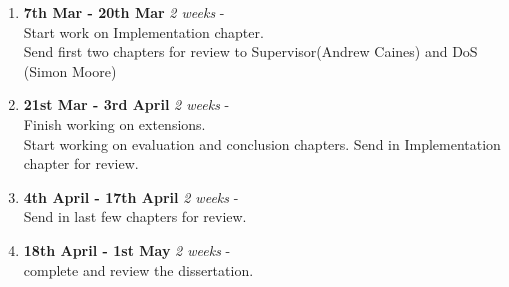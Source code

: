 \documentclass[12pt, a4paper]{article}
\begin{document}
\begin{enumerate}
  \item \textbf{{7th Mar - 20th Mar}} \textit{2 weeks}  -\\
  Start work on Implementation chapter.\\
  Send first two chapters for review to Supervisor(Andrew Caines) and DoS (Simon Moore)
  
  \item \textbf{{21st Mar - 3rd April}} \textit{2 weeks}  -\\
  Finish working on extensions. \\
  Start working on evaluation and conclusion chapters.
  Send in Implementation chapter for review.
  
  \item \textbf{{4th April - 17th April}} \textit{2 weeks}  -\\
  Send in last few chapters for review.
  
  \item \textbf{{18th April - 1st May}} \textit{2 weeks}  -\\
  complete and review the dissertation.
\end{enumerate}

\end{document}
